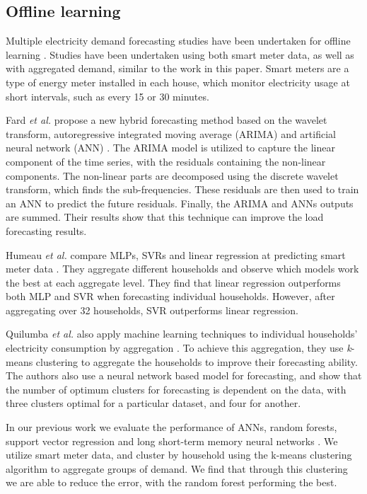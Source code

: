 \documentclass[final,3p,times,twocolumn,numbers]{elsarticle}
\begin{document}
\subsection{Offline learning}

Multiple electricity demand forecasting studies have been undertaken for offline learning \cite{Chen2004, Gross1987, Ghofrani}. Studies have been undertaken using both smart meter data, as well as with aggregated demand, similar to the work in this paper. Smart meters are a type of energy meter installed in each house, which monitor electricity usage at short intervals, such as every 15 or 30 minutes.


Fard \textit{et al.} propose a new hybrid forecasting method based on the wavelet transform, autoregressive integrated moving average (ARIMA) and artificial neural network (ANN) \cite{Fard2014}. The ARIMA model is utilized to capture the linear component of the time series, with the residuals containing the non-linear components. The non-linear parts are decomposed using the discrete wavelet transform, which finds the sub-frequencies. These residuals are then used to train an ANN  to predict the future residuals. Finally, the ARIMA and ANNs outputs are summed. Their results show that this technique can improve the load forecasting results.    

Humeau \textit{et al.} compare MLPs, SVRs and linear regression at predicting smart meter data \cite{Humeau2013}. They aggregate different households and observe which models work the best at each aggregate level. They find that linear regression outperforms both MLP and SVR when forecasting individual households. However, after aggregating over 32 households, SVR outperforms linear regression.


Quilumba \textit{et al.} also apply machine learning techniques to individual households' electricity consumption by aggregation \cite{Fard2014}. To achieve this aggregation, they use \textit{k}-means clustering to aggregate the households to improve their forecasting ability. The authors also use a neural network based model for forecasting, and show that the number of optimum clusters for forecasting is dependent on the data, with three clusters optimal for a particular dataset, and four for another.

In our previous work we evaluate the performance of ANNs, random forests, support vector regression and long short-term memory neural networks \cite{Kell2018a}. We utilize smart meter data, and cluster by household using the k-means clustering algorithm to aggregate groups of demand. We find that through this clustering we are able to reduce the error, with the random forest performing the best.
\end{document}
